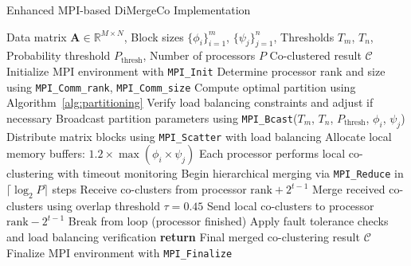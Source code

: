 \documentclass[journal]{IEEEtran}
\theoremstyle{definition}
\theoremstyle{remark} %
\begin{document}
\begin{algorithm}[!t]
    \caption{Enhanced MPI-based DiMergeCo Implementation}
    \begin{algorithmic}[1]
        \REQUIRE Data matrix $\mathbf{A} \in \mathbb{R}^{M \times N}$, Block sizes $\{\phi_i\}_{i=1}^m$, $\{\psi_j\}_{j=1}^n$, Thresholds $T_m$, $T_n$, Probability threshold $P_{\text{thresh}}$, Number of processors $P$
        \ENSURE Co-clustered result $\mathcal{C}$
        \STATE Initialize MPI environment with \texttt{MPI\_Init}
        \STATE Determine processor rank and size using \texttt{MPI\_Comm\_rank}, \texttt{MPI\_Comm\_size}
        \STATE Compute optimal partition using Algorithm~\ref{alg:partitioning}
        \STATE Verify load balancing constraints and adjust if necessary
        \ENDIF
        \STATE Broadcast partition parameters using \texttt{MPI\_Bcast}($T_m$, $T_n$, $P_{\text{thresh}}$, $\phi_i$, $\psi_j$)
        \STATE Distribute matrix blocks using \texttt{MPI\_Scatter} with load balancing
        \STATE Allocate local memory buffers: $1.2 \times \max(\phi_i \times \psi_j)$
        \STATE Each processor performs local co-clustering with timeout monitoring
        \STATE Begin hierarchical merging via \texttt{MPI\_Reduce} in $\lceil \log_2 P \rceil$ steps
        \STATE Receive co-clusters from processor $\text{rank} + 2^{t-1}$
        \STATE Merge received co-clusters using overlap threshold $\tau = 0.45$
        \STATE Send local co-clusters to processor $\text{rank} - 2^{t-1}$
        \STATE Break from loop (processor finished)
        \ENDIF
        \ENDFOR
        \STATE Apply fault tolerance checks and load balancing verification
        \STATE \textbf{return} Final merged co-clustering result $\mathcal{C}$
        \ENDIF
        \STATE Finalize MPI environment with \texttt{MPI\_Finalize}
    \end{algorithmic}
    \label{alg:mpi-method}
\end{algorithm}
\end{document}
